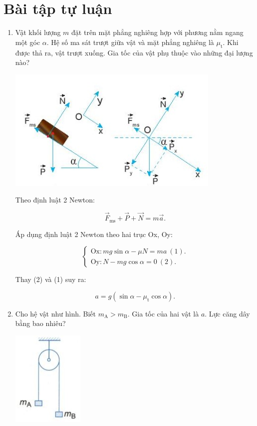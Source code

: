 \let\lesson\undefined
\newcommand{\lesson}{\phantomlesson{Bài 12.}}
\setcounter{section}{2}
\section{Bài tập tự luận}
\begin{enumerate}[label=\bfseries Bài \arabic*:]
	\item {}
	
	
	{
		Vật khối lượng $m$ đặt trên mặt phẳng nghiêng hợp với phương nằm ngang một góc $\alpha$. Hệ số ma sát trượt giữa vật và mặt phẳng nghiêng là $\mu_\text{t}$. Khi được thả ra, vật trượt xuống. Gia tốc của vật phụ thuộc vào những đại lượng nào?
		
	}
	
	\hideall
	{
		\begin{center}
			\includegraphics[scale=1]{../figs/VN10-2022-PH-TP021-3.jpg}
		\end{center}
		Theo định luật 2 Newton:
		
		$$ \vec F_\text{ms} + \vec P + \vec N = m\vec a.$$
		
		
		
		Áp dụng định luật 2 Newton theo hai trục Ox, Oy:
		
		$$\begin{cases}
			\text{Ox}:  mg\sin \alpha - \mu N= ma\ (1).\\
			\text{Oy}: 	N - mg\cos \alpha = 0\ (2).
		\end{cases}$$
		
		Thay (2) và (1) suy ra:
		
		$$a = g(\sin \alpha - \mu_\text{t} \cos \alpha).$$
	}
	
	\item {}
	
	
	{Cho hệ vật như hình. Biết $m_\text{A} > m_\text{B}$. Gia tốc của hai vật là $a$. Lực căng dây bằng bao nhiêu?
		\begin{center}
			\includegraphics[scale=1]{../figs/VN10-2022-PH-TP021-22.jpg}
		\end{center}
	}
	

\end{enumerate}
